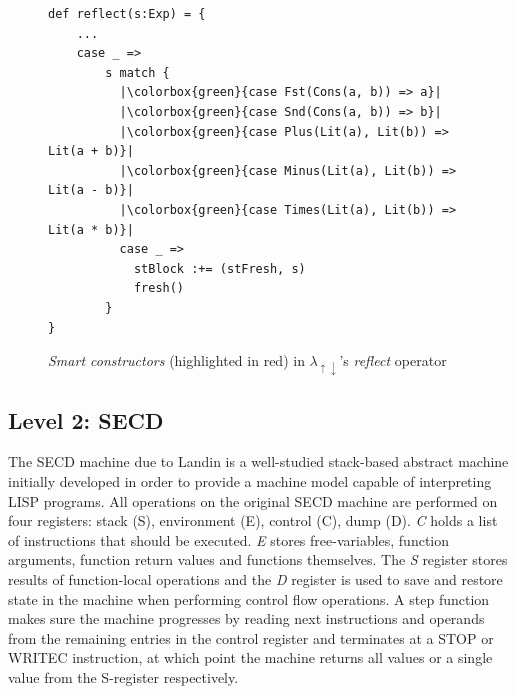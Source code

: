 \documentclass[a4paper,12pt,twoside,openright]{report}
\theoremstyle{definition}
\newcommand{\mslang}{$\lambda_{\uparrow\downarrow}$}
\begin{document}
\begin{figure}
    \centering
    \begin{verbatim}
def reflect(s:Exp) = {
    ...
    case _ =>
        s match {
          |\colorbox{green}{case Fst(Cons(a, b)) => a}|
          |\colorbox{green}{case Snd(Cons(a, b)) => b}|
          |\colorbox{green}{case Plus(Lit(a), Lit(b)) => Lit(a + b)}|
          |\colorbox{green}{case Minus(Lit(a), Lit(b)) => Lit(a - b)}|
          |\colorbox{green}{case Times(Lit(a), Lit(b)) => Lit(a * b)}|
          case _ =>
            stBlock :+= (stFresh, s)
            fresh()
        }
}
    \end{verbatim}
    \caption{\textit{Smart constructors} (highlighted in red) in \mslang's \textit{reflect} operator}
    \label{lst:mslang_interp}
\end{figure}


\subsection{Level 2: SECD}\label{sec:secd}
The SECD machine due to Landin \cite{landin1964mechanical} is a well-studied stack-based abstract machine initially developed in order to provide a machine model capable of interpreting LISP programs. All operations on the original SECD machine are performed on four registers: stack (S), environment (E), control (C), dump (D). \textit{C} holds a list of instructions that should be executed. \textit{E} stores free-variables, function arguments, function return values and functions themselves. The \textit{S} register stores results of function-local operations and the \textit{D} register is used to save and restore state in the machine when performing control flow operations. A step function makes sure the machine progresses by reading next instructions and operands from the remaining entries in the control register and terminates at a STOP or WRITEC instruction, at which point the machine returns all values or a single value from the S-register respectively.
\end{document}
